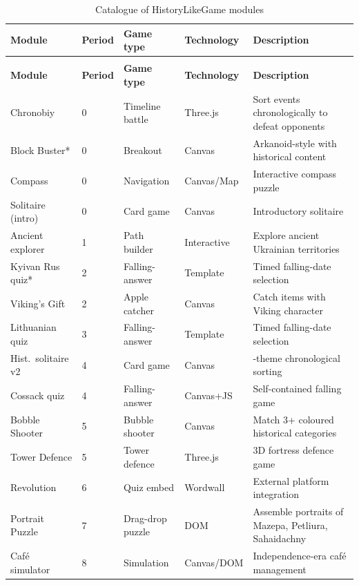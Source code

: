 \begin{small}
\begin{longtable}{@{}>{\raggedright}p{3.0cm}l>{\raggedright}p{2.3cm}>{\raggedright}p{2.2cm}>{\raggedright\arraybackslash}p{3.0cm}@{}}
\caption{Catalogue of HistoryLikeGame modules} \label{tab:game-catalog} \\
\hline
\textbf{Module} & \textbf{Period} & \textbf{Game type} & \textbf{Technology} & \textbf{Description} \\
\hline
\endfirsthead
\multicolumn{5}{l}{\textit{Table~\ref{tab:game-catalog} continued}} \\
\hline
\textbf{Module} & \textbf{Period} & \textbf{Game type} & \textbf{Technology} & \textbf{Description} \\
\hline
\endhead
\hline
\endfoot
Chronobiy & 0 & Timeline battle & Three.js & Sort events chronologically to defeat opponents \\
Block Buster* & 0 & Breakout & Canvas & Arkanoid-style with historical content \\
Compass & 0 & Navigation & Canvas/Map & Interactive compass puzzle \\
Solitaire (intro) & 0 & Card game & Canvas & Introductory solitaire \\
Ancient explorer & 1 & Path builder & Interactive & Explore ancient Ukrainian territories \\
Kyivan Rus quiz* & 2 & Falling-answer & Template & Timed falling-date selection \\
Viking's Gift & 2 & Apple catcher & Canvas & Catch items with Viking character \\
Lithuanian quiz & 3 & Falling-answer & Template & Timed falling-date selection \\
Hist.\ solitaire v2 & 4 & Card game & Canvas & 4-theme chronological sorting \\
Cossack quiz & 4 & Falling-answer & Canvas+JS & Self-contained falling game \\
Bobble Shooter & 5 & Bubble shooter & Canvas & Match 3+ coloured historical categories \\
Tower Defence & 5 & Tower defence & Three.js & 3D fortress defence game \\
Revolution & 6 & Quiz embed & Wordwall & External platform integration \\
Portrait Puzzle & 7 & Drag-drop puzzle & DOM & Assemble portraits of Mazepa, Petliura, Sahaidachny \\
Caf\'{e} simulator & 8 & Simulation & Canvas/DOM & Independence-era caf\'{e} management \\

\end{longtable}
\end{small}
